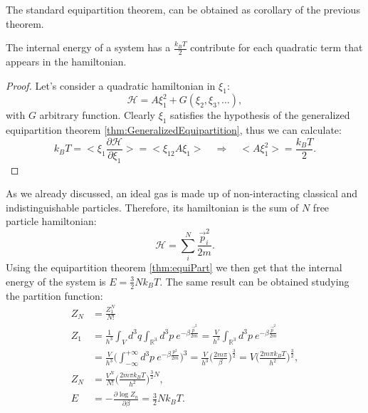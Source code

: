 The standard equipartition theorem, can be obtained as corollary of the previous theorem. 
\begin{corollary}\label{thm:equiPart}
    The internal energy of a system has a $\frac{k_BT}{2}$ contribute for each quadratic term that appears in the hamiltonian.
\end{corollary}
\begin{proof}
    Let's consider a quadratic hamiltonian in $\xi_1$:
    \begin{equation*}
        \mathcal{H} =A\xi_1^2+G(\xi_2,\xi_3,\dots),
    \end{equation*}
    with $G$ arbitrary function. Clearly $\xi_1$ satisfies the hypothesis of the generalized equipartition theorem \ref{thm:GeneralizedEquipartition}, thus we can calculate:
    \begin{equation*}
        k_BT=\bigg<\xi_1\frac{\partial\mathcal{H} }{\partial \xi_1}\bigg>=\big<\xi_12A\xi_1\big>\quad \Rightarrow\quad \big<A\xi_1^2\big>=\frac{k_BT}{2}.
    \end{equation*} 
\end{proof}
\begin{example}
    As we already discussed, an ideal gas is made up of non-interacting classical and indistinguishable particles. Therefore, its hamiltonian is the sum of $N$ free particle hamiltonian:
    \begin{equation*}
        \mathcal{H}=\sum_i^N\frac{\vec p^2_i}{2m}.
    \end{equation*}
    Using the equipartition theorem \ref{thm:equiPart} we then get that the internal energy of the system is $E=\frac{3}{2}Nk_BT$. The same result can be obtained studying the partition function:
    \begin{align*}
        Z_N&=\frac{Z_1^N}{N!}\\
        Z_1&=\frac{1}{h^3}\int_V d^3q\int_{\mathbb{R}^3}d^3p\ e^{-\beta\frac{\vec{ p}^2}{2m}}=\frac{V}{h^3}\int_{\mathbb{R}^3}d^3p\ e^{-\beta\frac{\vec{ p}^2}{2m}}\\&=\frac{V}{h^3}\bigg(\int_{-\infty}^{+\infty}d^3p\ e^{-\beta\frac{ p^2}{2m}}\bigg)^3=\frac{V}{h^3}\bigg(\frac{2m\pi}{\beta}\bigg)^{\frac{3}{2}}=V\bigg(\frac{2m\pi k_BT}{h^2}\bigg)^{\frac{3}{2}},\\
        Z_N&=\frac{V^N}{N!}\bigg(\frac{2m\pi k_BT}{h^2}\bigg)^{\frac{3}{2}N},\\
        E&=-\frac{\partial \log Z_n}{\partial\beta}=\frac{3}{2}Nk_BT.
    \end{align*}

\end{example}
